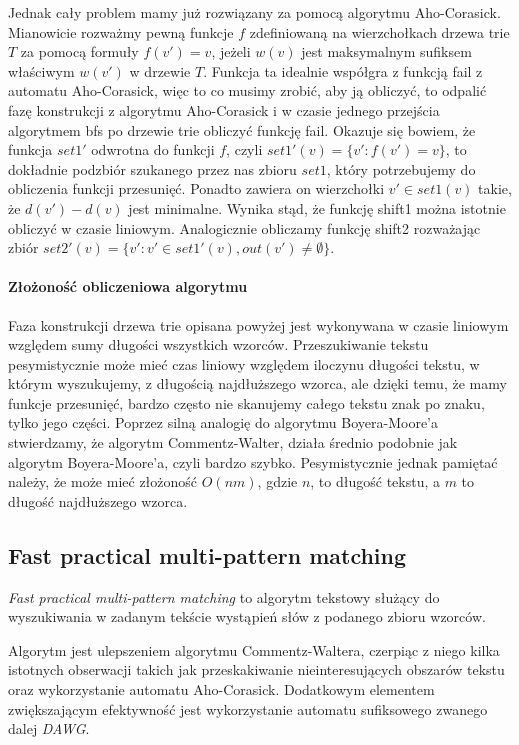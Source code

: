 Jednak cały problem mamy już rozwiązany za pomocą algorytmu Aho-Corasick. Mianowicie rozważmy pewną funkcje $f$ zdefiniowaną na wierzchołkach drzewa trie $T$ za pomocą formuły $f(v') = v$, jeżeli $w(v)$ jest maksymalnym sufiksem właściwym $w(v')$ w drzewie $T$. Funkcja ta idealnie współgra z funkcją fail z automatu Aho-Corasick, więc to co musimy zrobić, aby ją obliczyć, to odpalić fazę konstrukcji z algorytmu Aho-Corasick i w czasie jednego przejścia algorytmem bfs po drzewie trie obliczyć funkcję fail. Okazuje się bowiem, że funkcja $set1'$ odwrotna do funkcji $f$, czyli $set1'(v) = \{v' : f(v')=v \}$, to dokładnie podzbiór szukanego przez nas zbioru $set1$, który potrzebujemy do obliczenia funkcji przesunięć. Ponadto zawiera on wierzchołki $v' \in set1(v)$ takie, że $d(v')-d(v)$ jest minimalne. Wynika stąd, że funkcję shift1 można istotnie obliczyć w czasie liniowym. Analogicznie obliczamy funkcję shift2 rozważając zbiór $set2'(v) = \{ v' : v' \in set1'(v), out(v') \not = \emptyset\}$. 

\paragraph{Złożoność obliczeniowa algorytmu}
Faza konstrukcji drzewa trie opisana powyżej jest wykonywana w czasie liniowym względem sumy długości wszystkich wzorców. Przeszukiwanie tekstu pesymistycznie może mieć czas liniowy względem iloczynu długości tekstu, w którym wyszukujemy, z długością najdłuższego wzorca, ale dzięki temu, że mamy funkcje przesunięć, bardzo często nie skanujemy całego tekstu znak po znaku, tylko jego części. Poprzez silną analogię do algorytmu Boyera-Moore'a stwierdzamy, że algorytm Commentz-Walter, działa średnio podobnie jak algorytm Boyera-Moore'a, czyli bardzo szybko. Pesymistycznie jednak pamiętać należy, że może mieć złożoność $O(nm)$, gdzie $n$, to długość tekstu, a $m$ to długość najdłuższego wzorca.

\subsection{Fast practical multi-pattern matching}
\textit{Fast practical multi-pattern matching} to algorytm tekstowy służący do wyszukiwania w zadanym tekście wystąpień słów z podanego zbioru wzorców.

Algorytm jest ulepszeniem algorytmu Commentz-Waltera, czerpiąc z niego kilka istotnych obserwacji takich jak przeskakiwanie nieinteresujących obszarów tekstu oraz wykorzystanie automatu Aho-Corasick. Dodatkowym elementem zwiększającym efektywność jest wykorzystanie automatu sufiksowego zwanego dalej \textit{DAWG}.   

